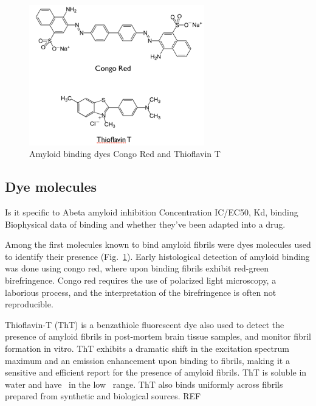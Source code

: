 \begin{figure}
\centering
\includegraphics[width=3in]{figures/introduction/dyes.png}
\caption[Small molecule binders]{Amyloid binding dyes Congo Red and Thioflavin T}
\label{fig:amyloid_dyes}
\end{figure}

\subsection{Dye molecules}

Is it specific to Abeta amyloid inhibition
Concentration IC/EC50, Kd, binding
Biophysical data of binding and whether they've been adapted into a drug.

Among the first molecules known to bind amyloid fibrils were dyes molecules used to identify their presence (Fig.~\ref{fig:amyloid_dyes}). Early histological detection of amyloid binding was done using congo red, where upon binding fibrils exhibit red-green birefringence. Congo red requires the use of polarized light microscopy, a laborious process, and the interpretation of the birefringence is often not reproducible.


Thioflavin-T (ThT) is a benzathiole fluorescent dye also used to detect the presence of amyloid fibrils in post-mortem brain tissue samples, and monitor fibril formation in vitro. ThT exhibits a dramatic shift in the excitation spectrum maximum and an emission enhancement upon binding to fibrils, making it a sensitive and efficient report for the presence of amyloid fibrils.  ThT is soluble in water and have \KD\ in the low \micromolar\ range.  ThT also binds uniformly across fibrils prepared from synthetic and biological sources.
REF

